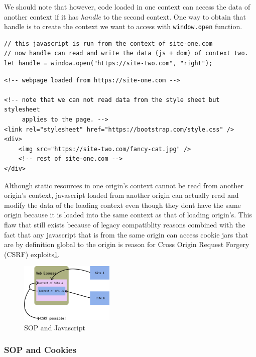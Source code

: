 \documentclass[a4paper]{article}
\begin{document}
We should note that however, code loaded in one context can access the data of another context if it has \emph{handle} to the second
context. One way to obtain that handle is to create the context we want to access with \lstinline{window.open} function.

\begin{lstlisting}
// this javascript is run from the context of site-one.com
// now handle can read and write the data (js + dom) of context two.
let handle = window.open("https://site-two.com", "right");
\end{lstlisting}


\begin{lstlisting}
<!-- webpage loaded from https://site-one.com -->

<!-- note that we can not read data from the style sheet but stylesheet 
     applies to the page. -->
<link rel="stylesheet" href="https://bootstrap.com/style.css" />
<div>
    <img src="https://site-two.com/fancy-cat.jpg" />
    <!-- rest of site-one.com -->
</div>
\end{lstlisting}


Although static resources in one origin's context cannot be read from another origin's context, javascript loaded from another
origin can actually read and modify the data of the loading context even though they dont have the same origin because it is loaded
into the same context as that of loading origin's. This flaw that still exists because of legacy compatiblity reasons combined with 
the fact that any javascript that is from the same origin can access cookie jars that are by definition global to the origin is 
reason for Cross Origin Request Forgery (CSRF) exploits\ref{fig:csfr}.

\begin{figure}[hbt!]
    \centering
    \includegraphics[width=0.4\textwidth]{graphics/same-origin-csrf.png}
    \caption{SOP and Javascript}
    \label{fig:csfr}
\end{figure}

\subsubsection*{SOP and Cookies}
\end{document}
